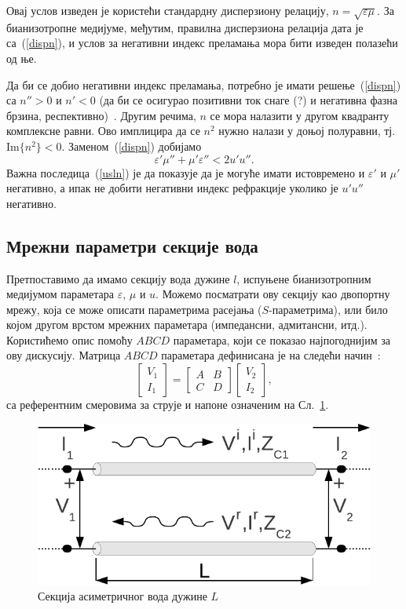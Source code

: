 Овај услов изведен је користећи стандардну дисперзиону релацију, $n=\sqrt{\varepsilon\mu}$. За бианизотропне медијуме, међутим, правилна дисперзиона релација дата је са~(\ref{dispn}), и услов за негативни индекс преламања мора бити изведен полазећи од ње.

Да би се добио негативни индекс преламања, потребно је имати решење~(\ref{dispn}) са $n''>0$ и $n'<0$ (да би се осигурао позитивни ток снаге (?) и негативна фазна брзина, респективно)~\cite{mccall}. Другим речима, $n$ се мора налазити у другом квадранту комплексне равни. Ово имплицира да се $n^2$ нужно налази у доњој полуравни, тј. $\mathrm{Im}\{n^2\}<0$. Заменом~(\ref{dispn}) добијамо
\begin{equation}\label{usln}
\varepsilon'\mu''+\mu'\varepsilon'' < 2u'u''.
\end{equation}
Важна последица~(\ref{usln}) је да показује да је могуће имати истовремено и $\varepsilon'$ и $\mu'$ негативно, а ипак не добити негативни индекс рефракције уколико је $u'u''$ негативно.

\subsection{Мрежни параметри секције вода}
Претпоставимо да имамо секцију вода дужине $l$, испуњене бианизотропним медијумом параметара $\varepsilon$, $\mu$ и $u$. Можемо посматрати ову секцију као двопортну мрежу, која се може описати параметрима расејања ($S$-параметрима), или било којом другом врстом мрежних параметара (импедансни, адмитансни, итд.). Користићемо опис помоћу $ABCD$ параметара, који се показао најпогоднијим за ову дискусију. Матрица $ABCD$ параметара дефинисана је на следећи начин~\cite{Pozar:05}:
\begin{equation}\label{abcd_osn}
\begin{bmatrix} V_1 \\ I_1 \end{bmatrix} = 
\begin{bmatrix} A & B \\ C & D \end{bmatrix}
\begin{bmatrix} V_2 \\ I_2 \end{bmatrix},
\end{equation}
са референтним смеровима за струје и напоне означеним на Сл.~\ref{fpole}.
\begin{figure}[!t]
\centering
\includegraphics[width=0.5\columnwidth]{slike/sekcija.pdf}
\caption{Секција асиметричног вода дужине $L$}
\label{fpole}
\end{figure}

